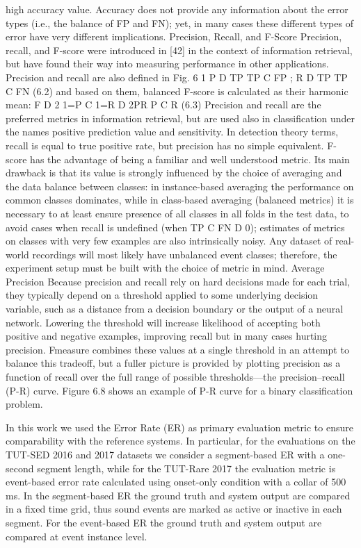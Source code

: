 high accuracy value. Accuracy does not provide any information about the error
types (i.e., the balance of FP and FN); yet, in many cases these different types of
error have very different implications.
Precision, Recall, and F-Score Precision, recall, and F-score were introduced in
[42] in the context of information retrieval, but have found their way into measuring
performance in other applications. Precision and recall are also defined in Fig. 6
1
P D
TP
TP C FP
; R D
TP
TP C FN
(6.2)
and based on them, balanced F-score is calculated as their harmonic mean:
F D
2
1=P C 1=R D
2PR
P C R
(6.3)
Precision and recall are the preferred metrics in information retrieval, but are used
also in classification under the names positive prediction value and sensitivity. In
detection theory terms, recall is equal to true positive rate, but precision has no
simple equivalent.
F-score has the advantage of being a familiar and well understood metric. Its
main drawback is that its value is strongly influenced by the choice of averaging
and the data balance between classes: in instance-based averaging the performance
on common classes dominates, while in class-based averaging (balanced metrics) it
is necessary to at least ensure presence of all classes in all folds in the test data, to
avoid cases when recall is undefined (when TP C FN D 0); estimates of metrics on
classes with very few examples are also intrinsically noisy. Any dataset of real-world
recordings will most likely have unbalanced event classes; therefore, the experiment
setup must be built with the choice of metric in mind.
Average Precision Because precision and recall rely on hard decisions made for
each trial, they typically depend on a threshold applied to some underlying decision
variable, such as a distance from a decision boundary or the output of a neural
network. Lowering the threshold will increase likelihood of accepting both positive
and negative examples, improving recall but in many cases hurting precision. Fmeasure combines these values at a single threshold in an attempt to balance this
tradeoff, but a fuller picture is provided by plotting precision as a function of
recall over the full range of possible thresholds—the precision–recall (P-R) curve.
Figure 6.8 shows an example of P-R curve for a binary classification problem.

In this work we used the Error Rate (ER) as primary evaluation metric to ensure comparability with the reference systems. In particular, for the evaluations on the TUT-SED 2016 and 2017 datasets we consider a segment-based ER with a one-second segment length, while for the TUT-Rare 2017 the evaluation metric is event-based error rate calculated using onset-only condition with a collar of 500 ms. 
In the segment-based ER the ground truth and system output are compared in a fixed time grid, thus sound events are marked as active or inactive in each segment. For the event-based ER the ground truth and system output are compared at event instance level.


